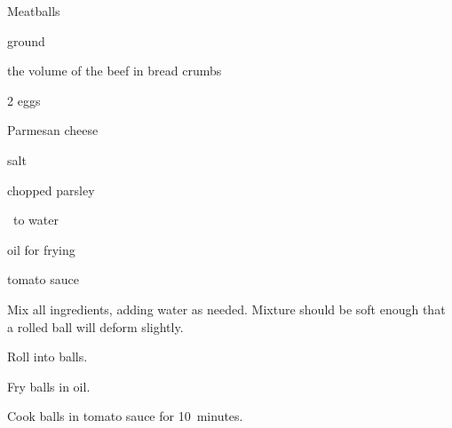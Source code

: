 \begin{recipe}{Meatballs}{}{}

\begin{ingredients}
\item {} ground 
\item \half the volume of the beef in bread crumbs
\item 2 eggs
\item {} Parmesan cheese
\item salt
\item chopped parsley
\item \quarter\ to \C{\half} water
\item oil for frying
\item tomato sauce
\end{ingredients}

\begin{directions}
\item Mix all ingredients, adding water as needed. Mixture should be soft enough that a rolled ball will deform slightly.
\item Roll into balls.
\item Fry balls in oil.
\item Cook balls in tomato sauce for 10~minutes.
\end{directions}

\end{recipe}
